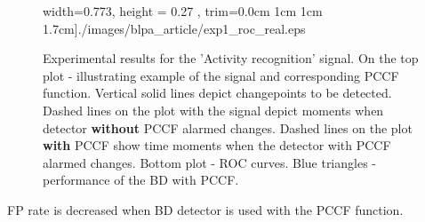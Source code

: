 \begin{figure}[!htb]
\begin{minipage}{0.5\textwidth}
{            width=0.773\textwidth, 
            height = 0.27 \textheight,
            trim={0.0cm 1cm 1cm 1.7cm}]{./images/blpa_article/exp1_roc_real.eps}
            }
        \caption{
         Experimental results for the 'Activity recognition' signal.
         On the top plot - illustrating example of the signal and corresponding PCCF function.
         Vertical solid lines depict changepoints to be detected. 
         Dashed lines on the plot with the signal depict moments when detector \textbf{without} PCCF alarmed changes. 
         Dashed lines on the plot \textbf{with} PCCF show time moments when the detector with PCCF alarmed changes.
         Bottom plot - ROC curves. 
        Blue triangles - performance of the BD with PCCF.
            }
            \label{fig:results2}
    \end{minipage}
\end{figure}
FP rate is decreased when BD detector is used with the PCCF function.


